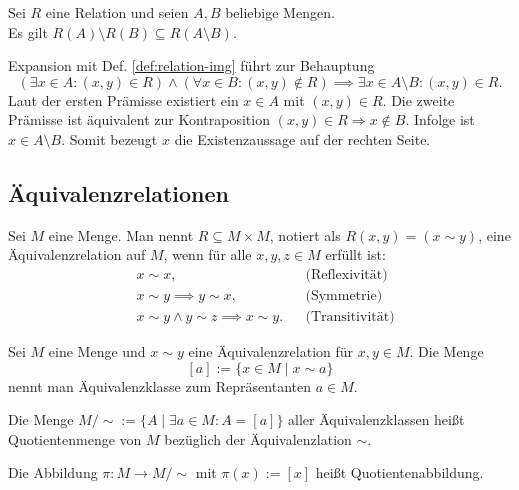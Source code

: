 \begin{Satz}
Sei $R$ eine Relation und seien $A,B$ beliebige Mengen.\\
Es gilt $R(A)\setminus R(B)\subseteq R(A\setminus B)$.
\end{Satz}
\begin{Beweis}
Expansion mit Def. \ref{def:relation-img} führt zur Behauptung
\[(\exists x\in A\colon (x,y)\in R)\land (\forall x\in B\colon (x,y)\notin R)
\implies \exists x\in A\setminus B\colon (x,y)\in R.\]
Laut der ersten Prämisse existiert ein $x\in A$ mit $(x,y)\in R$. Die
zweite Prämisse ist äquivalent zur Kontraposition $(x,y)\in R\Rightarrow x\notin B$.
Infolge ist $x\in A\setminus B$. Somit bezeugt $x$ die
Existenzaussage auf der rechten Seite.\,\qedsymbol
\end{Beweis}

\subsection{Äquivalenzrelationen}

\begin{Definition}[Äquivalenzrelation]\newlinefirst
Sei $M$ eine Menge. Man nennt $R\subseteq M\times M$, notiert als
$R(x,y) = (x\sim y)$, eine Äquivalenzrelation auf $M$, wenn für alle
$x,y,z\in M$ erfüllt ist:%
\begin{align*}
& x\sim x, && \text{(Reflexivität)}\\
& x\sim y\implies y\sim x, && \text{(Symmetrie)}\\
& x\sim y\land y\sim z\implies x\sim y. && \text{(Transitivität)}
\end{align*}
\end{Definition}

\begin{Definition}[Äquivalenzklasse]\newlinefirst
Sei $M$ eine Menge und $x\sim y$ eine Äquivalenzrelation für $x,y\in M$.
Die Menge%
\[[a] := \{x\in M\mid x\sim a\}\]
nennt man Äquivalenzklasse zum Repräsentanten $a\in M$.
\end{Definition}

\begin{Definition}[Quotientenmenge]\newlinefirst
Die Menge $M/{\sim} := \{A\mid \exists a\in M\colon A = [a]\}$
aller Äquivalenzklassen heißt Quotientenmenge von $M$ bezüglich der
Äquivalenzlation ${\sim}$.
\end{Definition}

\begin{Definition}[Quotientenabbildung]\newlinefirst
Die Abbildung $\pi\colon M\to M/{\sim}$ mit $\pi(x):=[x]$
heißt Quotientenabbildung.
\end{Definition}

